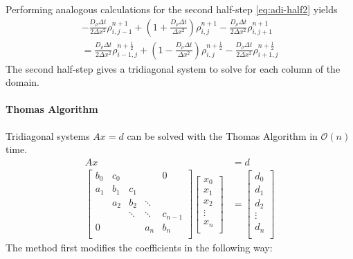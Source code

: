 \documentclass[a4paper]{article}
\begin{document}
Performing analogous calculations for the second half-step \ref{eq:adi-half2} yields
\begin{multline}
	-\frac{D_\rho \Delta t}{2 \Delta x^2} \rho_{i,j-1}^{n + 1} + \left( 1 + \frac{D_\rho \Delta t}{\Delta x^2} \right) \rho_{i,j}^{n + 1} - \frac{D_\rho \Delta t}{2 \Delta x^2} \rho_{i,j+1}^{n + 1} \\
	= \frac{D_\rho \Delta t}{2 \Delta x^2} \rho_{i-1,j}^{n + \frac{1}{2}} + \left( 1 - \frac{D_\rho \Delta t}{\Delta x^2} \right) \rho_{i,j}^{n + \frac{1}{2}} - \frac{D_\rho \Delta t}{2 \Delta x^2} \rho_{i+1,j}^{n + \frac{1}{2}}
\end{multline}
The second half-step gives a tridiagonal system to solve for each column of the domain.

\paragraph{Thomas Algorithm}
Tridiagonal systems $Ax = d$ can be solved with the Thomas Algorithm in $\mathcal O(n)$ time.
\begin{align}
	Ax &= d \\
\begin{bmatrix}
   {b_0} & {c_0} & {   } & {   } & { 0 } \\
   {a_1} & {b_1} & {c_1} & {   } & {   } \\
   {   } & {a_2} & {b_2} & \ddots & {   } \\
   {   } & {   } & \ddots & \ddots & {c_{n-1}}\\
   { 0 } & {   } & {   } & {a_n} & {b_n}\\
\end{bmatrix}
\begin{bmatrix}
   {x_0 }  \\
   {x_1 }  \\
   {x_2 }  \\
   \vdots   \\
   {x_n }  \\
\end{bmatrix}
&=
\begin{bmatrix}
   {d_0 }  \\
   {d_1 }  \\
   {d_2 }  \\
   \vdots   \\
   {d_n }  \\
\end{bmatrix}
\end{align}
The method first modifies the coefficients in the following way:
\end{document}
